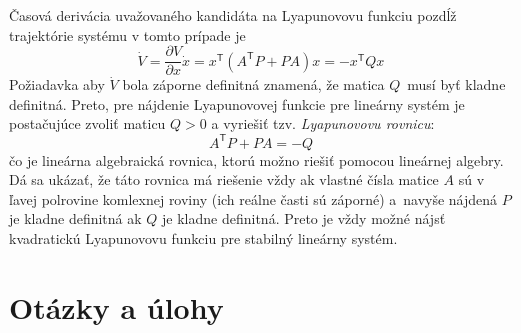 \documentclass[a4paper, 10pt, ]{article}
\begin{document}
Časová derivácia uvažovaného kandidáta na Lyapunovovu funkciu pozdĺž trajektórie systému v tomto prípade je
\begin{equation}
	\dot{V} = \frac{\partial V}{\partial x} \dot{x} = x^\mathsf{T} \left( A^\mathsf{T}P + PA \right) x = -x^\mathsf{T}Qx
\end{equation}
Požiadavka aby $\dot{V}$ bola záporne definitná znamená, že matica $Q$~musí byť kladne definitná. Preto, pre nájdenie Lyapunovovej funkcie pre lineárny systém je postačujúce zvoliť maticu $Q > 0$ a vyriešiť tzv. \emph{Lyapunovovu rovnicu}:
\begin{equation}
	 A^\mathsf{T}P + PA = -Q
\end{equation}
čo je lineárna algebraická rovnica, ktorú možno riešiť pomocou lineárnej algebry. Dá sa ukázať, že táto rovnica má riešenie vždy ak vlastné čísla matice $A$ sú v ľavej polrovine komlexnej roviny (ich reálne časti sú záporné) a~navyše nájdená $P$ je kladne definitná ak $Q$ je kladne definitná. Preto je vždy možné nájsť kvadratickú Lyapunovovu funkciu pre stabilný lineárny systém.


















\section{Otázky a úlohy}
\end{document}
